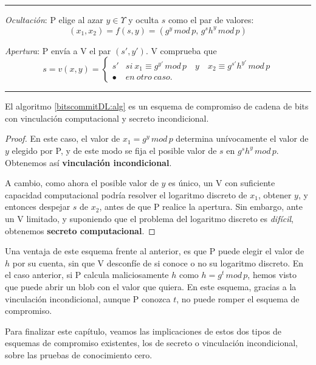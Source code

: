 \hfil

\rule{\textwidth}{1pt}
\begin{algorithm}
	\hfil
	
	\textit{Ocultación}: P elige al azar $y\in \Upsilon$ y oculta $s$ como el par de valores:
	\[(x_1,x_2) = f(s,y) = ( g^y \, mod \, p ,\, g^sh^y \, mod \, p) \]
	
	\textit{Apertura}: P envía a V el par $(s',y')$. V comprueba que
	\[ s = v(x,y) = 
	\begin{cases}
	s' & si\ x_1\equiv g^{y'} \, mod \, p  \quad y \quad x_2\equiv  g^{s'}h^{y'} \, mod \, p \\
	\bullet & en\ otro\ caso.
	\end{cases}
	\]
	\label{bitscommitDL2:alg}
\end{algorithm}
\rule{\textwidth}{1pt}

\hfil


\begin{proposition}
	El algoritmo \ref{bitscommitDL:alg} es un esquema de compromiso de cadena de bits con vinculación computacional y secreto incondicional.
\end{proposition}

\begin{proof}
	En este caso, el valor de $x_1 = g^y \, mod \, p$ determina unívocamente el valor de $y$ elegido por P, y de este modo se fija el posible valor de $s$ en $g^s h^y\, mod\, p$. Obtenemos así \textbf{vinculación incondicional}.
	
	A cambio, como ahora el posible valor de $y$ es único, un V con suficiente capacidad computacional podría resolver el logaritmo discreto de $x_1$, obtener $y$, y entonces despejar $s$ de $x_2$, antes de que P realice la apertura. Sin embargo, ante un V limitado, y suponiendo que el problema del logaritmo discreto es \textit{difícil}, obtenemos \textbf{secreto computacional}.
\end{proof}

Una ventaja de este esquema frente al anterior, es que P puede elegir el valor de $h$ por su cuenta, sin que V desconfíe de si conoce o no su logaritmo discreto. En el caso anterior, si P calcula maliciosamente $h$ como $h=g^t\,mod\,p$, hemos visto que puede abrir un blob con el valor que quiera. En este esquema, gracias a la vinculación incondicional, aunque P conozca $t$, no puede romper el esquema de compromiso. 	

\hfil

Para finalizar este capítulo, veamos las implicaciones de estos dos tipos de esquemas de compromiso existentes, los de secreto o vinculación incondicional, sobre las pruebas de conocimiento cero.

